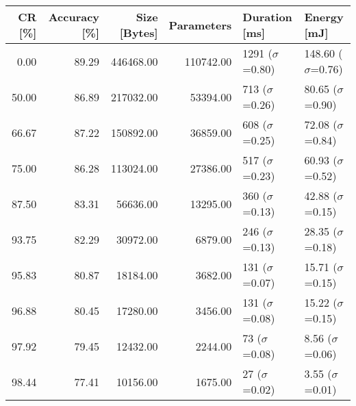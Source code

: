 \begin{tabular}{rrrrll}
\toprule
   CR [\%] & Accuracy [\%] & Size [Bytes] & Parameters &         Duration [ms] &             Energy [mJ] \\
\midrule
      0.00 &         89.29 &    446468.00 &  110742.00 &  1291 ($\sigma$=0.80) &  148.60 ($\sigma$=0.76) \\
     50.00 &         86.89 &    217032.00 &   53394.00 &   713 ($\sigma$=0.26) &   80.65 ($\sigma$=0.90) \\
     66.67 &         87.22 &    150892.00 &   36859.00 &   608 ($\sigma$=0.25) &   72.08 ($\sigma$=0.84) \\
     75.00 &         86.28 &    113024.00 &   27386.00 &   517 ($\sigma$=0.23) &   60.93 ($\sigma$=0.52) \\
     87.50 &         83.31 &     56636.00 &   13295.00 &   360 ($\sigma$=0.13) &   42.88 ($\sigma$=0.15) \\
     93.75 &         82.29 &     30972.00 &    6879.00 &   246 ($\sigma$=0.13) &   28.35 ($\sigma$=0.18) \\
     95.83 &         80.87 &     18184.00 &    3682.00 &   131 ($\sigma$=0.07) &   15.71 ($\sigma$=0.15) \\
     96.88 &         80.45 &     17280.00 &    3456.00 &   131 ($\sigma$=0.08) &   15.22 ($\sigma$=0.15) \\
     97.92 &         79.45 &     12432.00 &    2244.00 &    73 ($\sigma$=0.08) &    8.56 ($\sigma$=0.06) \\
     98.44 &         77.41 &     10156.00 &    1675.00 &    27 ($\sigma$=0.02) &    3.55 ($\sigma$=0.01) \\
\bottomrule
\end{tabular}
